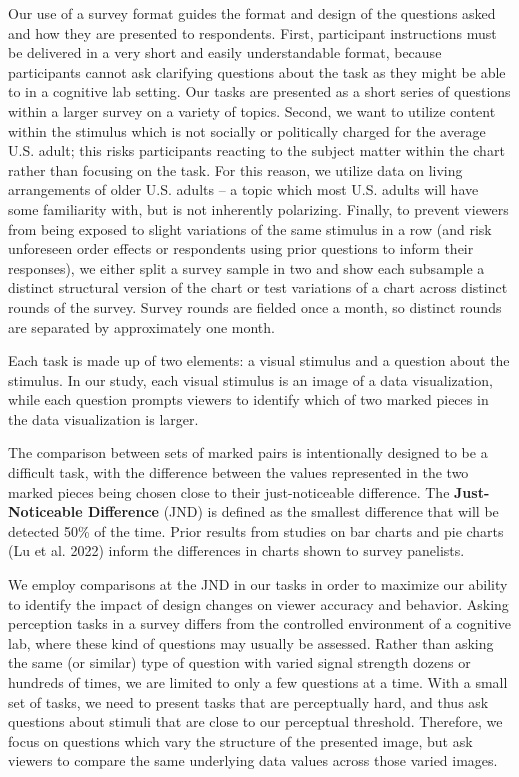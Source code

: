 \documentclass[
]{jds}
\begin{document}
Our use of a survey format guides the format and design of the questions
asked and how they are presented to respondents. First, participant
instructions must be delivered in a very short and easily understandable
format, because participants cannot ask clarifying questions about the
task as they might be able to in a cognitive lab setting. Our tasks are
presented as a short series of questions within a larger survey on a
variety of topics. Second, we want to utilize content within the
stimulus which is not socially or politically charged for the average
U.S. adult; this risks participants reacting to the subject matter
within the chart rather than focusing on the task. For this reason, we
utilize data on living arrangements of older U.S. adults -- a topic
which most U.S. adults will have some familiarity with, but is not
inherently polarizing. Finally, to prevent viewers from being exposed to
slight variations of the same stimulus in a row (and risk unforeseen
order effects or respondents using prior questions to inform their
responses), we either split a survey sample in two and show each
subsample a distinct structural version of the chart or test variations
of a chart across distinct rounds of the survey. Survey rounds are
fielded once a month, so distinct rounds are separated by approximately
one month.

Each task is made up of two elements: a visual stimulus and a question
about the stimulus. In our study, each visual stimulus is an image of a
data visualization, while each question prompts viewers to identify
which of two marked pieces in the data visualization is larger.

The comparison between sets of marked pairs is intentionally designed to
be a difficult task, with the difference between the values represented
in the two marked pieces being chosen close to their just-noticeable
difference. The \textbf{Just-Noticeable Difference} (JND) is defined as
the smallest difference that will be detected 50\% of the time. Prior
results from studies on bar charts and pie charts (Lu et al. 2022)
inform the differences in charts shown to survey panelists.

We employ comparisons at the JND in our tasks in order to maximize our
ability to identify the impact of design changes on viewer accuracy and
behavior. Asking perception tasks in a survey differs from the
controlled environment of a cognitive lab, where these kind of questions
may usually be assessed. Rather than asking the same (or similar) type
of question with varied signal strength dozens or hundreds of times, we
are limited to only a few questions at a time. With a small set of
tasks, we need to present tasks that are perceptually hard, and thus ask
questions about stimuli that are close to our perceptual threshold.
Therefore, we focus on questions which vary the structure of the
presented image, but ask viewers to compare the same underlying data
values across those varied images.
\end{document}
